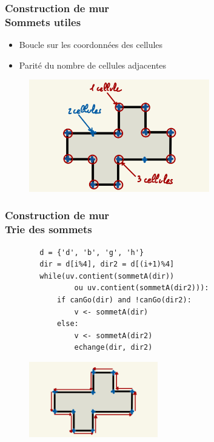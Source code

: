 \documentclass{beamer}
\begin{document}
\begin{frame}
    \frametitle{Construction de mur \\
                \small Sommets utiles}
    \begin{block}{}
        \begin{itemize}
            \item Boucle sur les coordonnées des cellules
            \item Parité du nombre de cellules adjacentes
        \end{itemize}
    \end{block}
    \begin{figure}
        \centering
        \includegraphics[width=0.7\textwidth]{images/sommets_utiles.jpg}
    \end{figure}
\end{frame}

\begin{frame}[fragile]
    \frametitle{Construction de mur \\
                \small Trie des sommets}
    \vspace*{-0.5cm}
    \begin{minipage}[t][4cm][t]{\textwidth}
        \small\begin{lstlisting}
        d = {'d', 'b', 'g', 'h'}
        dir = d[i%4], dir2 = d[(i+1)%4]
        while(uv.contient(sommetA(dir)) 
                ou uv.contient(sommetA(dir2))):
            if canGo(dir) and !canGo(dir2):
                v <- sommetA(dir)
            else:
                v <- sommetA(dir2)
                echange(dir, dir2)
        \end{lstlisting}
    \end{minipage}
    \begin{figure}
        \centering
        \includegraphics[width=0.5\textwidth]{images/tri_sommet.jpg}
    \end{figure}
\end{frame}
\end{document}
